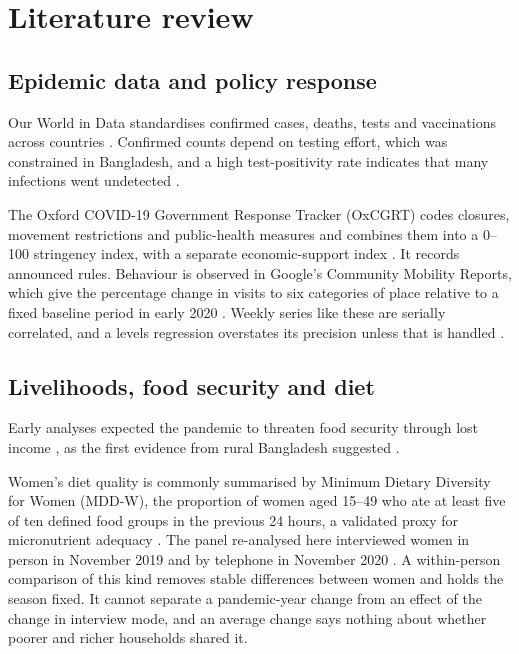 \chapter{Literature review}\label{ch:lit}

\section{Epidemic data and policy response}
Our World in Data standardises confirmed cases, deaths, tests and vaccinations across countries \parencite{owid2024,hasell2020,mathieu2021}. Confirmed counts depend on testing effort, which was constrained in Bangladesh, and a high test-positivity rate indicates that many infections went undetected \parencite{hasell2020}.

The Oxford COVID-19 Government Response Tracker (OxCGRT) codes closures, movement restrictions and public-health measures and combines them into a 0--100 stringency index, with a separate economic-support index \parencite{hale2021}. It records announced rules. Behaviour is observed in Google's Community Mobility Reports, which give the percentage change in visits to six categories of place relative to a fixed baseline period in early 2020 \parencite{google2022}. Weekly series like these are serially correlated, and a levels regression overstates its precision unless that is handled \parencite{newey1987}.

\section{Livelihoods, food security and diet}
Early analyses expected the pandemic to threaten food security through lost income \parencite{laborde2020}, as the first evidence from rural Bangladesh suggested \parencite{hamadani2020}.

Women's diet quality is commonly summarised by Minimum Dietary Diversity for Women (MDD-W), the proportion of women aged 15--49 who ate at least five of ten defined food groups in the previous 24 hours, a validated proxy for micronutrient adequacy \parencite{fao2021}. The panel re-analysed here interviewed women in person in November 2019 and by telephone in November 2020 \parencite{panel2021}. A within-person comparison of this kind removes stable differences between women and holds the season fixed. It cannot separate a pandemic-year change from an effect of the change in interview mode, and an average change says nothing about whether poorer and richer households shared it.

